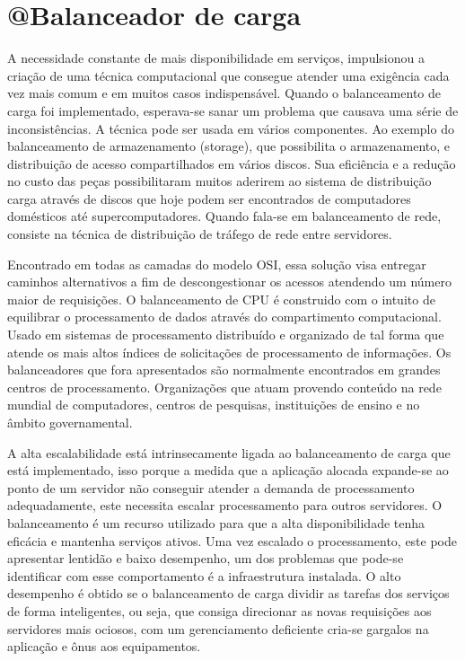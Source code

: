 \chapter{@Balanceador de carga}


A necessidade constante de mais disponibilidade em serviços, impulsionou a criação de uma técnica computacional 
que consegue atender uma exigência cada vez mais comum e em muitos casos indispensável. Quando o balanceamento 
de carga foi implementado, esperava-se sanar um problema que causava uma série de inconsistências. A técnica pode
ser usada em vários componentes. Ao exemplo do balanceamento de armazenamento (storage), que possibilita o 
armazenamento, e distribuição de acesso compartilhados em vários discos. Sua eficiência e a redução no custo das 
peças possibilitaram muitos aderirem ao sistema de distribuição carga através de discos  que hoje podem ser 
encontrados de computadores domésticos até supercomputadores. Quando fala-se em balanceamento de rede, consiste 
na técnica de distribuição de tráfego de rede entre servidores.


Encontrado em todas as camadas do modelo OSI, essa solução visa entregar caminhos alternativos a fim de descongestionar
os acessos atendendo um número maior de requisições. O balanceamento de CPU é construido com o intuito de equilibrar o
processamento de dados através do compartimento computacional. Usado em sistemas de processamento distribuído e 
organizado de tal forma que atende os mais altos índices de solicitações de processamento de informações. Os 
balanceadores que fora apresentados são normalmente encontrados em grandes centros de processamento. Organizações 
que atuam provendo conteúdo na rede mundial de computadores, centros de pesquisas, instituições de ensino e no âmbito
governamental.


A alta escalabilidade está intrinsecamente ligada ao balanceamento de carga que está implementado, isso porque a medida 
que a aplicação alocada expande-se ao ponto de um servidor não conseguir atender a demanda de processamento adequadamente,
este necessita escalar processamento para outros servidores. O balanceamento é um recurso utilizado para que a alta
disponibilidade tenha eficácia e mantenha serviços ativos. Uma vez escalado o processamento, este pode apresentar lentidão
e baixo desempenho, um dos problemas que pode-se identificar com esse comportamento é a infraestrutura instalada. 
O alto desempenho é obtido se o balanceamento de carga dividir as tarefas dos serviços de forma inteligentes, ou seja, 
que consiga direcionar as novas requisições aos servidores mais ociosos, com um gerenciamento deficiente cria-se gargalos
na aplicação e ônus aos equipamentos.



